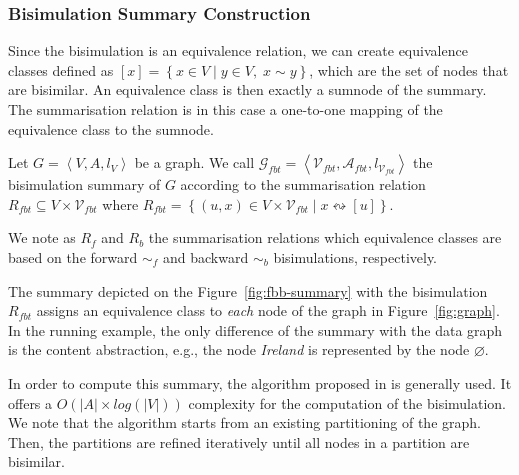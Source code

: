 \subsubsection{Bisimulation Summary Construction}

Since the bisimulation is an equivalence relation, we can create equivalence classes defined as $[x] = \left\lbrace x \in V \mid y \in V,\; x \sim y \right\rbrace$, which are the set of nodes that are bisimilar. An equivalence class is then exactly a sumnode of the summary. The summarisation relation is in this case a one-to-one mapping of the equivalence class to the sumnode.

\begin{definition}
Let $G=\left\langle V, A, l_V \right\rangle$ be a graph. We call $\mathcal{G}_{fbt} = \left\langle \mathcal{V}_{fbt}, \mathcal{A}_{fbt}, l_{\mathcal{V}_{fbt}} \right\rangle$ the bisimulation summary of $G$ according to the summarisation relation $R_{fbt} \subseteq V \times \mathcal{V}_{fbt}$ where $R_{fbt} = \left\lbrace \left( u, x \right) \in V \times \mathcal{V}_{fbt} \mid x \leftrightsquigarrow [u] \right\rbrace$.
\end{definition}

\begin{remark}
We note as $R_f$ and $R_b$ the summarisation relations which equivalence classes are based on the forward $\sim_f$ and backward $\sim_b$ bisimulations, respectively.
\end{remark}

The summary depicted on the Figure~\ref{fig:fbb-summary} with the bisimulation $R_{fbt}$ assigns an equivalence class to \emph{each} node of the graph in Figure~\ref{fig:graph}. In the running example, the only difference of the summary with the data graph is the content abstraction, e.g., the node \emph{Ireland} is represented by the node $\varnothing$.

In order to compute this summary, the algorithm proposed in \cite{Paige:1987:TPR:37185.37186} is generally used. It offers a $O\left( \vert A \vert \times log\left( \vert V \vert \right) \right)$ complexity for the computation of the bisimulation. We note that the algorithm starts from an existing partitioning of the graph. Then, the partitions are refined iteratively until all nodes in a partition are bisimilar.%

